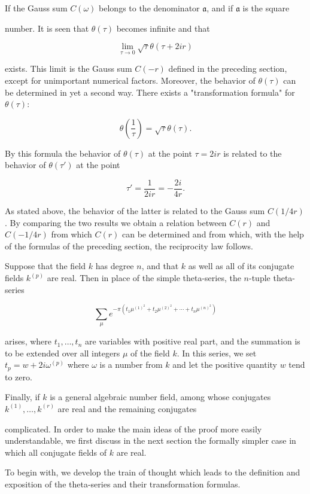 If the Gauss sum $C(\omega)$ belongs to the denominator $\mathfrak{a}$, and if $\mathfrak{a}$ is the square

number. It is seen that $\theta(\tau)$ becomes infinite and that

$$\lim_{\tau \to 0} \sqrt{\tau} \theta(\tau + 2ir)$$

exists. This limit is the Gauss sum $C(-r)$ defined in the preceding section, except for unimportant numerical factors. Moreover, the behavior of $\theta(\tau)$ can be determined in yet a second way. There exists a "transformation formula" for $\theta(\tau)$:

$$\theta\left(\frac{1}{\tau}\right) = \sqrt{\tau} \theta(\tau).$$

By this formula the behavior of $\theta(\tau)$ at the point $\tau = 2ir$ is related to the behavior of $\theta(\tau')$ at the point

$$\tau' = \frac{1}{2ir} = -\frac{2i}{4r}.$$

As stated above, the behavior of the latter is related to the Gauss sum $C(1/4r)$. By comparing the two results we obtain a relation between $C(r)$ and $C(-1/4r)$ from which $C(r)$ can be determined and from which, with the help of the formulas of the preceding section, the reciprocity law follows.

Suppose that the field $k$ has degree $n$, and that $k$ as well as all of its conjugate fields $k^{(p)}$ are real. Then in place of the simple theta-series, the $n$-tuple theta-series

$$\sum_{\mu} e^{-\pi(t_1\mu^{(1)}^2 + t_2\mu^{(2)}^2 + \cdots + t_n\mu^{(n)}^2)}$$

arises, where $t_1, \ldots, t_n$ are variables with positive real part, and the summation is to be extended over all integers $\mu$ of the field $k$. In this series, we set $t_p = w + 2i\omega^{(p)}$ where $\omega$ is a number from $k$ and let the positive quantity $w$ tend to zero.

Finally, if $k$ is a general algebraic number field, among whose conjugates $k^{(1)}, \ldots, k^{(r)}$ are real and the remaining conjugates

complicated. In order to make the main ideas of the proof more easily understandable, we first discuss in the next section the formally simpler case in which all conjugate fields of $k$ are real.

To begin with, we develop the train of thought which leads to the definition and exposition of the theta-series and their transformation formulas.

